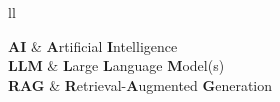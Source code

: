 \documentclass[
11pt, %
oneside, %
english, %
singlespacing, %
headsepline, %
]{style} %
\begin{document}
\begin{abbreviations}{ll} %

	\textbf{AI} & \textbf{A}rtificial \textbf{I}ntelligence\\
	\textbf{LLM} & \textbf{L}arge \textbf{L}anguage \textbf{M}odel(s)\\
	\textbf{RAG} & \textbf{R}etrieval-\textbf{A}ugmented \textbf{G}eneration\\

\end{abbreviations}












\end{document}
